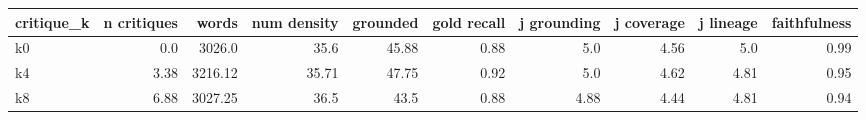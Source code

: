 \begin{tabular}{lrrrrrrrrr}
\toprule
critique\_k & n critiques & words & num density & grounded & gold recall & j grounding & j coverage & j lineage & faithfulness \\
\midrule
k0 & 0.0 & 3026.0 & 35.6 & 45.88 & 0.88 & 5.0 & 4.56 & 5.0 & 0.99 \\
k4 & 3.38 & 3216.12 & 35.71 & 47.75 & 0.92 & 5.0 & 4.62 & 4.81 & 0.95 \\
k8 & 6.88 & 3027.25 & 36.5 & 43.5 & 0.88 & 4.88 & 4.44 & 4.81 & 0.94 \\
\bottomrule
\end{tabular}
